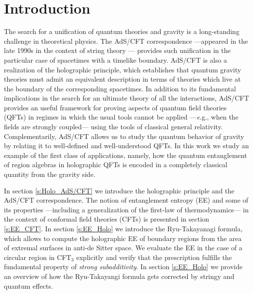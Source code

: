 \documentclass[twocolumn]{revtex4}
\begin{document}
\section{Introduction} \label{s:Intro}
The search for a unification of quantum theories and gravity is a long-standing challenge in theoretical physics. The AdS/CFT correspondence ---appeared in the late 1990s in the context of string theory \cite{maldacena_large_1999}--- provides such unification in the particular case of spacetimes with a timelike boundary. AdS/CFT is also a realization of the holographic principle, which establishes that quantum gravity theories must admit an equivalent description in terms of theories which live at the boundary of the corresponding spacetimes.  %
In addition to its fundamental implications in the search for an ultimate theory of all the interactions, AdS/CFT provides an useful framework for proving aspects of quantum field theories (QFTs) in regimes in which the usual tools cannot be applied ---{\emph e.g.,} when the fields are strongly coupled--- using the tools of classical general relativity. %
Complementarily, AdS/CFT allows us to study the quantum behavior of gravity by relating it to well-defined and well-understood QFTs.
In this work we study an example of the first class of applications, namely, how the quantum entanglement of region algebras in holographic QFTs is encoded in a completely classical quantity from the gravity side.


In section \ref{s:Holo_AdS/CFT} we introduce the holographic principle and the AdS/CFT correspondence. The notion of entanglement entropy (EE) and some of its properties ---including a generalization of the first-law of thermodynamics--- in the context of conformal field theories (CFTs) is presented in section \ref{s:EE_CFT}. In section \ref{s:EE_Holo} we introduce the Ryu-Takayanagi formula, which allows to compute the holographic EE of boundary regions from the area of extremal surfaces in anti-de Sitter space. We evaluate the EE in the case of a circular region in CFT$_3$ explicitly and verify that the prescription fulfills the fundamental property of {\it strong subadditivity}. In section \ref{s:EE_Holo} we provide an overview of how the Ryu-Takayangi formula gets corrected by stringy and quantum effects. 
\end{document}
